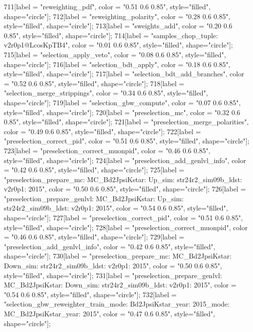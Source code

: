 {	711[label = "reweighting_pdf", color = "0.51 0.6 0.85", style="filled", shape="circle"];
	712[label = "reweighting_polarity", color = "0.28 0.6 0.85", style="filled", shape="circle"];
	713[label = "sweights_add", color = "0.20 0.6 0.85", style="filled", shape="circle"];
	714[label = "samples_chop_tuple\nversion: v2r0p1@LcosKpTB4", color = "0.01 0.6 0.85", style="filled", shape="circle"];
	715[label = "selection_apply_veto", color = "0.08 0.6 0.85", style="filled", shape="circle"];
	716[label = "selection_bdt_apply", color = "0.18 0.6 0.85", style="filled", shape="circle"];
	717[label = "selection_bdt_add_branches", color = "0.52 0.6 0.85", style="filled", shape="circle"];
	718[label = "selection_merge_strippings", color = "0.34 0.6 0.85", style="filled", shape="circle"];
	719[label = "selection_gbw_compute", color = "0.07 0.6 0.85", style="filled", shape="circle"];
	720[label = "preselection_mc", color = "0.32 0.6 0.85", style="filled", shape="circle"];
	721[label = "preselection_merge_polarities", color = "0.49 0.6 0.85", style="filled", shape="circle"];
	722[label = "preselection_correct_pid", color = "0.51 0.6 0.85", style="filled", shape="circle"];
	723[label = "preselection_correct_muonpid", color = "0.46 0.6 0.85", style="filled", shape="circle"];
	724[label = "preselection_add_genlvl_info", color = "0.42 0.6 0.85", style="filled", shape="circle"];
	725[label = "preselection_prepare_mc\nmode: MC_Bd2JpsiKstar\npolarity: Up\nstrip_sim: str24r2_sim09b_ldst\nversion: v2r0p1\nyear: 2015", color = "0.50 0.6 0.85", style="filled", shape="circle"];
	726[label = "preselection_prepare_genlvl\nmode: MC_Bd2JpsiKstar\npolarity: Up\nstrip_sim: str24r2_sim09b_ldst\nversion: v2r0p1\nyear: 2015", color = "0.54 0.6 0.85", style="filled", shape="circle"];
	727[label = "preselection_correct_pid", color = "0.51 0.6 0.85", style="filled", shape="circle"];
	728[label = "preselection_correct_muonpid", color = "0.46 0.6 0.85", style="filled", shape="circle"];
	729[label = "preselection_add_genlvl_info", color = "0.42 0.6 0.85", style="filled", shape="circle"];
	730[label = "preselection_prepare_mc\nmode: MC_Bd2JpsiKstar\npolarity: Down\nstrip_sim: str24r2_sim09b_ldst\nversion: v2r0p1\nyear: 2015", color = "0.50 0.6 0.85", style="filled", shape="circle"];
	731[label = "preselection_prepare_genlvl\nmode: MC_Bd2JpsiKstar\npolarity: Down\nstrip_sim: str24r2_sim09b_ldst\nversion: v2r0p1\nyear: 2015", color = "0.54 0.6 0.85", style="filled", shape="circle"];
	732[label = "selection_gbw_reweighter_train\ndata_mode: Bd2JpsiKstar\ndata_year: 2015\nmc_mode: MC_Bd2JpsiKstar\nmc_year: 2015", color = "0.47 0.6 0.85", style="filled", shape="circle"];
}
